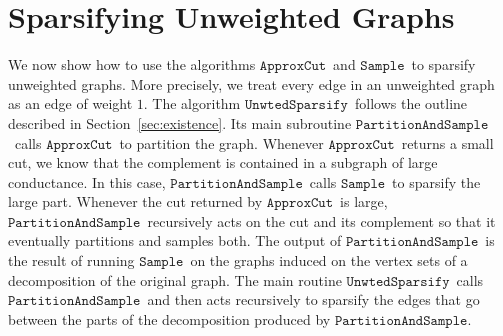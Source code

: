 \documentclass[11pt]{article}
\newcommand{\unwtedsparsify}{\ensuremath{\mathtt{UnwtedSparsify}}}
\newcommand{\sample}{\ensuremath{\mathtt{Sample}}}
\newcommand{\approxcut}{\ensuremath{\mathtt{ApproxCut}}}
\newcommand{\partsample}{\ensuremath{\mathtt{PartitionAndSample}}}
\begin{document}
\section{Sparsifying Unweighted Graphs}\label{sec:unweighted}
We now show how to use the algorithms \approxcut\ and \sample\
  to sparsify unweighted graphs.
More precisely, we treat every edge in an unweighted graph as an
  edge of weight $1$.
The algorithm \unwtedsparsify \ 
  follows the outline described in Section~\ref{sec:existence}.
Its main subroutine \partsample \ calls \approxcut \ to partition the graph.
Whenever \approxcut \ returns a small cut, we know that the complement
  is contained in a subgraph of large conductance.
In this case, \partsample \ calls \sample \ to sparsify the large part.
Whenever the cut returned by \approxcut \ is large, \partsample \
  recursively acts on the cut and its complement so that it eventually
  partitions and samples both.
The output of \partsample \ is 
  the result of running \sample \ on the graphs
  induced on the 
  vertex sets of a decomposition of the original graph.
The main routine \unwtedsparsify \ calls \partsample \ and then
  acts recursively to sparsify the edges that go between the parts
  of the decomposition produced by \partsample .
\end{document}
